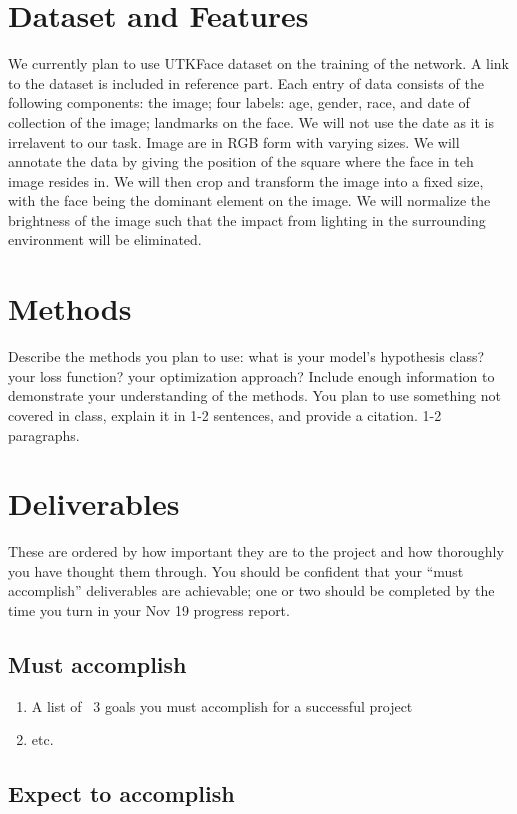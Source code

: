\documentclass{article}
\begin{document}
\section{Dataset and Features}
We currently plan to use UTKFace dataset on the training of the network. A link to the dataset is included in reference part. Each entry of data consists of the following components: the image; four labels: age, gender, race, and date of collection of the image; landmarks on the face. We will not use the date as it is irrelavent to our task. Image are in RGB form with varying sizes. We will annotate the data by giving the position of the square where the face in teh image resides in. We will then crop and transform the image into a fixed size, with the face being the dominant element on the image. We will normalize the brightness of the image such that the impact from lighting in the surrounding environment will be eliminated.

\section{Methods}
Describe the methods you plan to use: what is your model's hypothesis class? your loss function? your optimization approach? Include enough information to demonstrate your understanding of the methods. You plan to use something not covered in class, explain it in 1-2 sentences, and provide a citation. 1-2 paragraphs.

\section{Deliverables}
These are ordered by how important they are to the project and how thoroughly you have thought them through. You should be confident that your ``must accomplish'' deliverables are achievable; one or two should be completed by the time you turn in your Nov 19 progress report.

\subsection{Must accomplish}

\begin{enumerate}
    \item A list of ~3 goals you must accomplish for a successful project
    \item etc.
\end{enumerate}

\subsection{Expect to accomplish}
\end{document}

